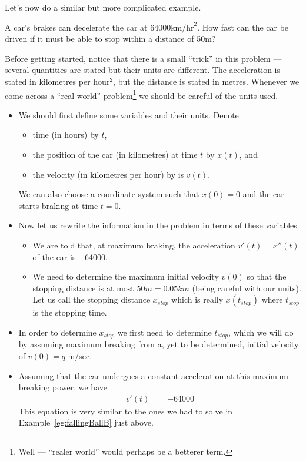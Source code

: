 Let's now do a similar but more complicated example.

\begin{eg}\label{eg:braking}
A car's brakes can decelerate the car at 64000$\textrm{km/hr}^2$.
How fast can the car be driven if it must be able to stop within a distance
of 50m?

\soln Before getting started, notice that there is a small ``trick'' in this problem
--- several quantities are stated but their units are different. The acceleration is
stated in kilometres per hour$^2$, but the distance is stated in metres. Whenever we come
across a ``real world'' problem\footnote{Well --- ``realer world'' would perhaps be a
betterer term.} we should be careful of the units used.

\begin{itemize}
 \item We should first define some variables and their units. Denote
\begin{itemize}
 \item time (in hours) by $t$,
 \item the position of the car (in kilometres) at time $t$ by $x(t)$, and
 \item the velocity (in kilometres per hour) by is $v(t)$.
\end{itemize}
  We can also choose a coordinate system such that $x(0)=0$ and the car starts
  braking at time $t=0$.

\item Now let us rewrite the information in the problem in terms of these variables.
\begin{itemize}
 \item We are told that, at maximum braking, the acceleration $v'(t)=x''(t)$ of the car
is $-64000$.
 \item We need to determine the maximum initial velocity $v(0)$ so that the stopping
distance is at most $50m = 0.05km$ (being careful with our units). Let us call the
stopping distance $x_{stop}$ which is really $x(t_{stop})$ where $t_{stop}$ is the
stopping time.
\end{itemize}

\item In order to determine $x_{stop}$ we first need to determine $t_{stop}$, which we
will do by assuming maximum breaking from a, yet to be determined, initial velocity of
$v(0)=q$ m/sec.

\item Assuming that the car undergoes a constant acceleration at this maximum breaking
power, we have
\begin{align*}
  v'(t) &= -64000
\end{align*}
This equation is very similar to the ones we had to solve in
Example~\ref{eg:fallingBallB} just above.


\end{itemize}
\end{eg}
